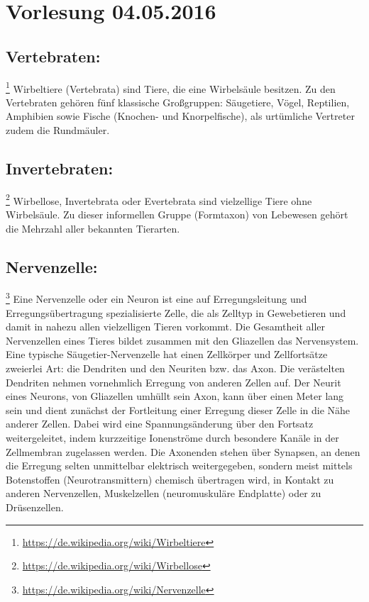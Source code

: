 \section{Vorlesung 04.05.2016}

\subsection{Vertebraten:}\footnote{\url{https://de.wikipedia.org/wiki/Wirbeltiere}} Wirbeltiere (Vertebrata) sind Tiere, die eine Wirbelsäule besitzen. Zu den Vertebraten gehören fünf klassische Großgruppen: Säugetiere, Vögel, Reptilien, Amphibien sowie Fische (Knochen- und Knorpelfische), als urtümliche Vertreter zudem die Rundmäuler.

\subsection{Invertebraten:}\footnote{\url{https://de.wikipedia.org/wiki/Wirbellose}} Wirbellose, Invertebrata oder Evertebrata sind vielzellige Tiere ohne Wirbelsäule. Zu dieser informellen Gruppe (Formtaxon) von Lebewesen gehört die Mehrzahl aller bekannten Tierarten.

\subsection{Nervenzelle:}\footnote{\url{https://de.wikipedia.org/wiki/Nervenzelle}} Eine Nervenzelle oder ein Neuron ist eine auf Erregungsleitung und Erregungsübertragung spezialisierte Zelle, die als Zelltyp in Gewebetieren und damit in nahezu allen vielzelligen Tieren vorkommt. Die Gesamtheit aller Nervenzellen eines Tieres bildet zusammen mit den Gliazellen das Nervensystem.\\
Eine typische Säugetier-Nervenzelle hat einen Zellkörper und Zellfortsätze zweierlei Art: die Dendriten und den Neuriten bzw. das Axon. Die verästelten Dendriten nehmen vornehmlich Erregung von anderen Zellen auf. Der Neurit eines Neurons, von Gliazellen umhüllt sein Axon, kann über einen Meter lang sein und dient zunächst der Fortleitung einer Erregung dieser Zelle in die Nähe anderer Zellen. Dabei wird eine Spannungsänderung über den Fortsatz weitergeleitet, indem kurzzeitige Ionenströme durch besondere Kanäle in der Zellmembran zugelassen werden.
Die Axonenden stehen über Synapsen, an denen die Erregung selten unmittelbar elektrisch weitergegeben, sondern meist mittels Botenstoffen (Neurotransmittern) chemisch übertragen wird, in Kontakt zu anderen Nervenzellen, Muskelzellen (neuromuskuläre Endplatte) oder zu Drüsenzellen.

